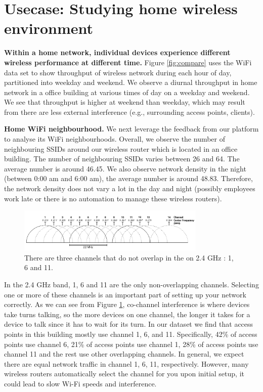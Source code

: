 \section{Usecase: Studying home wireless environment}
\label{sec.usecase3}

\textbf{Within a home network, individual devices experience different wireless performance at different time.} Figure \ref{fig:compare} uses the WiFi data set to show throughput of wireless network during each hour of day, partitioned into weekday and weekend. We observe a diurnal throughput in home network in a office building at various times of day on a weekday and weekend. We see that throughput is higher at weekend than weekday, which may result from there are less external interference (e.g., surrounding access points, clients).

\textbf{Home WiFi neighbourhood.} We next leverage the feedback from our platform to analyse its WiFi neighbourhoods. Overall, we observe the number of neighbouring SSIDs around our wireless router which is located in an office building. The number of neighbouring SSIDs varies between 26 and 64. The average number is around 46.45. We also observe network density in the night (between 0:00 am and 6:00 am), the average number is around 48.83. Therefore, the network density does not vary a lot in the day and night (possibly employees work late or there is no automation to manage these wireless routers).

\begin{figure}
\centering
\includegraphics[width=0.8\textwidth]{figure/2GHz_WiFi_channels.png}
\caption{There are three channels that do not overlap in the on 2.4 GHz : 1, 6 and 11.} 
\label{fig:channels}
\end{figure}

In the 2.4 GHz band, 1, 6 and 11 are the only non-overlapping channels. Selecting one or more of these channels is an important part of setting up your network correctly. As we can see from Figure \ref{fig:channels}, co-channel interference is where devices take turns talking, so the more devices on one channel, the longer it takes for a device to talk since it has to wait for its turn. In our dataset we find that access points in this building mostly use channel 1, 6, and 11. Specifically, 42\% of access points use channel 6, 21\% of access points use channel 1, 28\% of access points use channel 11 and the rest use other overlapping channels. In general, we expect there are equal network traffic in channel 1, 6, 11, respectively. However,  many wireless routers automatically select the channel for you upon initial setup, it could lead to slow Wi-Fi speeds and interference. 
